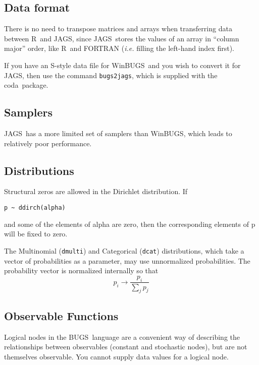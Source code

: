 \documentclass[11pt, a4paper, titlepage]{report}
\newcommand{\JAGS}{\textsf{JAGS}}
\newcommand{\BUGS}{\textsf{BUGS}}
\newcommand{\WinBUGS}{\textsf{WinBUGS}}
\newcommand{\R}{\textsf{R}}
\newcommand{\CODA}{\textsf{coda}}
\begin{document}
\subsection{Data format}

There is no need to transpose matrices and arrays when transferring
data between \R\ and \JAGS, since \JAGS\ stores the values of an array
in ``column major'' order, like \R\ and FORTRAN ({\em i.e.} filling
the left-hand index first).

If you have an \textsf{S}-style data file for \WinBUGS\ and you wish
to convert it for \JAGS, then use the command \texttt{bugs2jags},
which is supplied with the \CODA\ package.


\subsection{Samplers}

\JAGS\ has a more limited set of samplers than \WinBUGS, which leads
to relatively poor performance. 

\subsection{Distributions}

Structural zeros are allowed in the Dirichlet distribution. If
\begin{verbatim}
p ~ ddirch(alpha)
\end{verbatim}
and some of the elements of alpha are zero, then the corresponding
elements of p will be fixed to zero.

The Multinomial (\verb+dmulti+) and Categorical (\verb+dcat+)
distributions, which take a vector of probabilities as a parameter,
may use unnormalized probabilities. The probability vector is
normalized internally so that
\[
p_i \rightarrow \frac{p_i}{\sum_j p_j}
\]

\subsection{Observable Functions}
\label{section:obfun}

Logical nodes in the \BUGS\ language are a convenient way of
describing the relationships between observables (constant and
stochastic nodes), but are not themselves observable. You cannot
supply data values for a logical node.  
\end{document}
